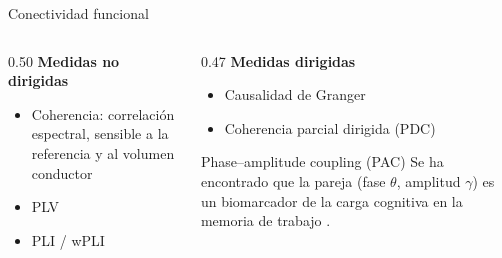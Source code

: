 

\begin{frame}{Conectividad funcional}
  \begin{columns}[T]
    \begin{column}{0.50\textwidth}
      \textbf{Medidas no dirigidas}
      \begin{itemize}
        \item Coherencia: correlación espectral, sensible a la referencia y al volumen conductor
        \item PLV  \cite{LeVanQuyen2001}
        \item PLI / wPLI \cite{Vinck2011}
      \end{itemize}
    \end{column}
    \begin{column}{0.47\textwidth}
      \textbf{Medidas dirigidas}
      \begin{itemize}
        \item Causalidad de Granger \cite{Granger1969}
        \item Coherencia parcial dirigida (PDC) 
      \end{itemize}
      \vspace{0.3em}
      \begin{block}{Phase--amplitude coupling (PAC)}
        \small Se ha encontrado que la pareja (fase $\theta$, amplitud $\gamma$) es un biomarcador de la carga cognitiva en la memoria de trabajo  \cite{Canolty2006}.
      \end{block}
    \end{column}
  \end{columns}
\end{frame}
